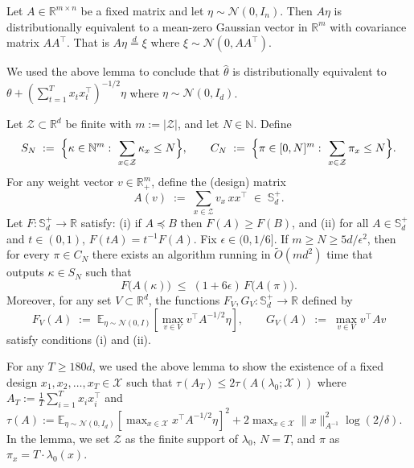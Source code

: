 \begin{lemma}\label{lem:linear-gaussian}
Let $A\in\mathbb{R}^{m\times n}$ be a fixed matrix and let $\eta\sim\mathcal{N}(0,I_n)$. Then $A\eta$ is distributionally equivalent to a mean-zero Gaussian vector in $\mathbb{R}^m$ with covariance matrix $AA^\top$. That is $A\eta\stackrel{d}{=}\xi$ where $\xi\sim \mathcal{N}(0,AA^\top)$.
\end{lemma}
We used the above lemma to conclude that $\widehat{\theta}$ is distributionally equivalent to $\theta+(\sum_{t=1}^T x_tx_t^\top)^{-1/2}\eta$ where $\eta\sim\mathcal{N}(0,I_d)$.


\begin{lemma}\label{lem:rounding-single}
Let $\mathcal{Z}\subset \mathbb{R}^d$ be finite with $m:=|\mathcal{Z}|$, and let $N\in\mathbb{N}$. Define
\[
S_N \;:=\;\Bigl\{\kappa\in \mathbb{N}^{m}:\ \sum_{x\in\mathcal{Z}} \kappa_x \le N\Bigr\},
\qquad
C_N \;:=\;\Bigl\{\pi\in [0,N]^{m}:\ \sum_{x\in\mathcal{Z}} \pi_x \le N\Bigr\}.
\]
For any weight vector $v\in \mathbb{R}_+^{m}$, define the (design) matrix
\[
A(v)\;:=\;\sum_{x\in\mathcal{Z}} v_x\, x x^\top \;\in\; \mathbb{S}_d^+.
\]
Let $F:\mathbb{S}_d^+\to \mathbb{R}$ satisfy:
(i) if $A\preceq B$ then $F(A)\ge F(B)$, and
(ii) for all $A\in\mathbb{S}_d^+$ and $t\in(0,1)$, $F(tA)=t^{-1}F(A)$.
Fix $\epsilon\in(0,1/6]$. If $m\ge N\ge 5d/\epsilon^2$, then for every $\pi\in C_N$ there exists an algorithm running in
$\widetilde{O}(m d^2)$ time that outputs $\kappa\in S_N$ such that
\[
F\!\bigl(A(\kappa)\bigr)\;\le\; (1+6\epsilon)\,F\!\bigl(A(\pi)\bigr).
\]
Moreover, for any set $V\subset \mathbb{R}^d$, the functions $F_V,G_V:\mathbb{S}_d^+\to\mathbb{R}$ defined by
\[
F_V(A)\;:=\;\mathbb{E}_{\eta\sim \mathcal{N}(0,I)}\!\left[\max_{v\in V} v^\top A^{-1/2}\eta\right],
\qquad
G_V(A)\;:=\;\max_{v\in V} v^\top A v
\]
satisfy conditions (i) and (ii).
\end{lemma}
For any $T\geq 180d$, we used the above lemma to show the existence of a fixed design $x_1,x_2,\ldots,x_T\in \mathcal{X}$ such that $\tau(A_T)\leq 2\tau(A(\lambda_0;\mathcal{X}))$ where $A_T:=\frac{1}{T}\sum_{i=1}^T x_ix_i^\top$ and $\tau(A):=\mathbb{E}_{\eta\sim\mathcal{N}(0,I_d)}\left[\max_{x\in\mathcal{X}}x^\top A^{-1/2}\eta\right]^2+2\max_{x\in\mathcal{X}}\|x\|_{A^{-1}}^2\log(2/\delta).$ In the lemma, we set $\mathcal{Z}$ as the finite support of $\lambda_0$, $N=T$, and $\pi$ as $\pi_x=T\cdot \lambda_0(x)$.

